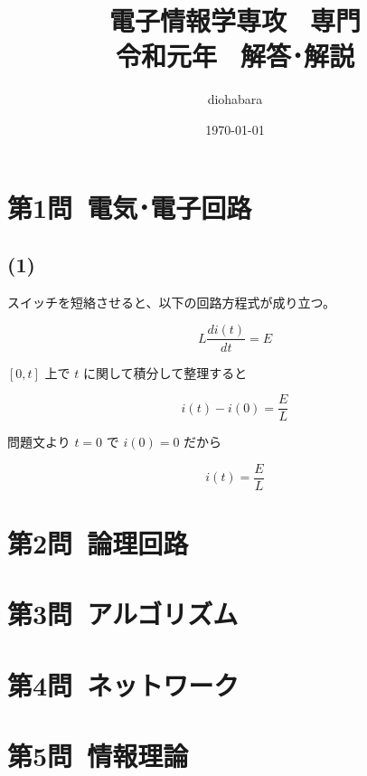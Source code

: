 \documentclass[a4paper,12pt,xelatex,ja=standard]{bxjsarticle}
\title{電子情報学専攻 \, 専門 \\ 令和元年 \, 解答･解説}
\author{diohabara}
\date{\today}
\begin{document}
\maketitle

\section*{第1問\ 電気･電子回路}

\subsection*{(1)}


スイッチを短絡させると、以下の回路方程式が成り立つ。

\[
  L \frac{d i(t)}{d t} = E
\]

\([0, t]\) 上で \(t\) に関して積分して整理すると

\[
  i(t) - i(0) = \frac{E}{L}
\]

問題文より $t = 0$ で $i(0) = 0$ だから

\[
  i(t) = \frac{E}{L}
\]

\section*{第2問\ 論理回路}
\section*{第3問\ アルゴリズム}
\section*{第4問\ ネットワーク}
\section*{第5問\ 情報理論}
\end{document}
